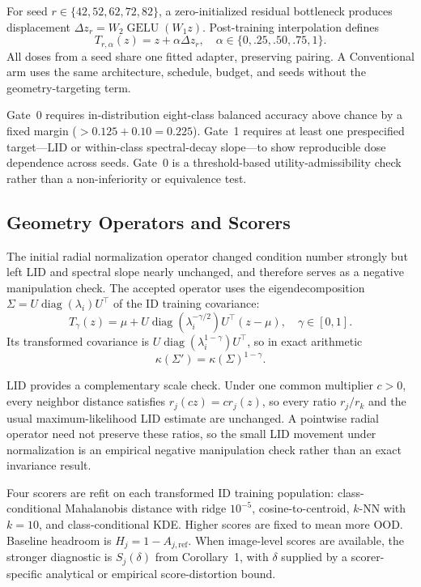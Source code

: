 \documentclass[11pt,a4paper]{article}
\begin{document}
For seed $r\in\{42,52,62,72,82\}$, a zero-initialized residual bottleneck produces displacement $\Delta z_r=W_2\operatorname{GELU}(W_1z)$. Post-training interpolation defines
\begin{equation}
T_{r,\alpha}(z)=z+\alpha\Delta z_r,\quad
\alpha\in\{0,.25,.50,.75,1\}.
\end{equation}
All doses from a seed share one fitted adapter, preserving pairing. A Conventional arm uses the same architecture, schedule, budget, and seeds without the geometry-targeting term.

Gate~0 requires in-distribution eight-class balanced accuracy above chance by a fixed margin ($>0.125+0.10=0.225$). Gate~1 requires at least one prespecified target---LID or within-class spectral-decay slope---to show reproducible dose dependence across seeds. Gate~0 is a threshold-based utility-admissibility check rather than a non-inferiority or equivalence test.

\subsection{Geometry Operators and Scorers}
The initial radial normalization operator changed condition number strongly but left LID and spectral slope nearly unchanged, and therefore serves as a negative manipulation check. The accepted operator uses the eigendecomposition $\Sigma=U\operatorname{diag}(\lambda_i)U^\top$ of the ID training covariance:
\begin{equation}
T_\gamma(z)=\mu+U\operatorname{diag}(\lambda_i^{-\gamma/2})U^\top(z-\mu),
\quad \gamma\in[0,1].
\end{equation}
Its transformed covariance is $U\operatorname{diag}(\lambda_i^{1-\gamma})U^\top$, so in exact arithmetic
\begin{equation}
\kappa(\Sigma')=\kappa(\Sigma)^{1-\gamma}.
\end{equation}

LID provides a complementary scale check. Under one common multiplier $c>0$, every neighbor distance satisfies $r_j(cz)=cr_j(z)$, so every ratio $r_j/r_k$ and the usual maximum-likelihood LID estimate are unchanged. A pointwise radial operator need not preserve these ratios, so the small LID movement under normalization is an empirical negative manipulation check rather than an exact invariance result.

Four scorers are refit on each transformed ID training population: class-conditional Mahalanobis distance with ridge $10^{-5}$, cosine-to-centroid, $k$-NN with $k=10$, and class-conditional KDE. Higher scores are fixed to mean more OOD. Baseline headroom is $H_j=1-A_{j,\mathrm{ref}}$. When image-level scores are available, the stronger diagnostic is $S_j(\delta)$ from Corollary~1, with $\delta$ supplied by a scorer-specific analytical or empirical score-distortion bound.
\end{document}
